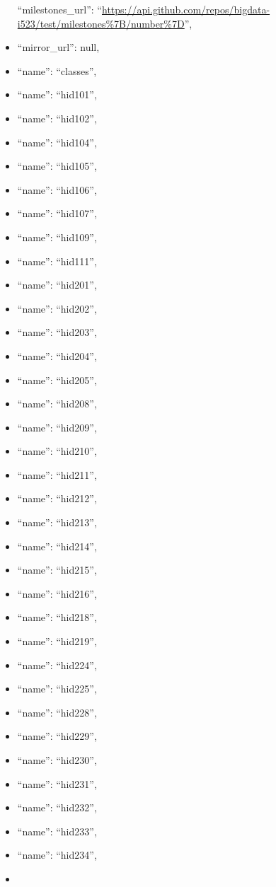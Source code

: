 \begin{itemize}
  ``milestones\_url'':
  ``\url{https://api.github.com/repos/bigdata-i523/test/milestones\%7B/number\%7D}'',
\item
  ``mirror\_url'': null,
\item
  ``name'': ``classes'',
\item
  ``name'': ``hid101'',
\item
  ``name'': ``hid102'',
\item
  ``name'': ``hid104'',
\item
  ``name'': ``hid105'',
\item
  ``name'': ``hid106'',
\item
  ``name'': ``hid107'',
\item
  ``name'': ``hid109'',
\item
  ``name'': ``hid111'',
\item
  ``name'': ``hid201'',
\item
  ``name'': ``hid202'',
\item
  ``name'': ``hid203'',
\item
  ``name'': ``hid204'',
\item
  ``name'': ``hid205'',
\item
  ``name'': ``hid208'',
\item
  ``name'': ``hid209'',
\item
  ``name'': ``hid210'',
\item
  ``name'': ``hid211'',
\item
  ``name'': ``hid212'',
\item
  ``name'': ``hid213'',
\item
  ``name'': ``hid214'',
\item
  ``name'': ``hid215'',
\item
  ``name'': ``hid216'',
\item
  ``name'': ``hid218'',
\item
  ``name'': ``hid219'',
\item
  ``name'': ``hid224'',
\item
  ``name'': ``hid225'',
\item
  ``name'': ``hid228'',
\item
  ``name'': ``hid229'',
\item
  ``name'': ``hid230'',
\item
  ``name'': ``hid231'',
\item
  ``name'': ``hid232'',
\item
  ``name'': ``hid233'',
\item
  ``name'': ``hid234'',
\item

\end{itemize}
